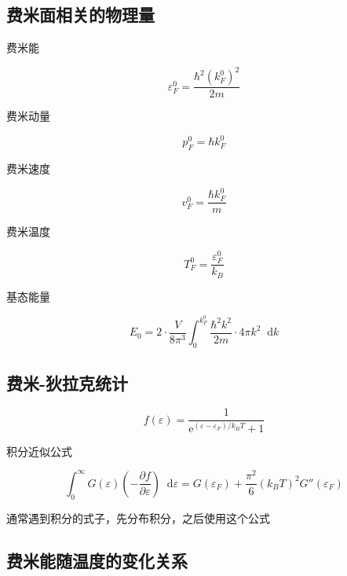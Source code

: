 \documentclass{article}
\newcommand*{\md}{\mathop{}\!\mathrm{d}}
\newcommand*{\me}{\mathrm{e}}
\begin{document}
\begin{multicols}{2}
\subsection{费米面相关的物理量}

费米能

\begin{equation*}
  \varepsilon_F^0 = \dfrac{\hbar^2 \left( k_F^0 \right)^2}{2m}
\end{equation*}

费米动量

\begin{equation*}
  p_F^0 = \hbar k_F^0
\end{equation*}

费米速度

\begin{equation*}
  v_F^0 = \dfrac{\hbar k_F^0}{m}
\end{equation*}

费米温度

\begin{equation*}
  T_F^0 = \dfrac{\varepsilon_F^0}{k_B}
\end{equation*}

基态能量

\begin{equation*}
  E_0 = 2\cdot \dfrac{V}{8\pi^3} \int_0^{k_F^0} \dfrac{\hbar^2 k^2}{2m} \cdot 4\pi k^2 \md k
\end{equation*}

\subsection{费米-狄拉克统计}

\begin{equation*}
  f \left( \varepsilon \right) = \dfrac{1}{\me^{\left( \varepsilon - \varepsilon_F \right)/k_B T} + 1}
\end{equation*}

积分近似公式

\begin{equation*}
  \int_0^{\infty} G \left( \varepsilon \right) \left( - \dfrac{\partial f}{\partial \varepsilon} \right) \md \varepsilon = G \left( \varepsilon_F \right) + \dfrac{\pi^2}{6} \left( k_B T \right)^2 G'' \left( \varepsilon_F \right)
\end{equation*}

通常遇到积分的式子，先分布积分，之后使用这个公式

\subsection{费米能随温度的变化关系}


\end{multicols}
\end{document}
